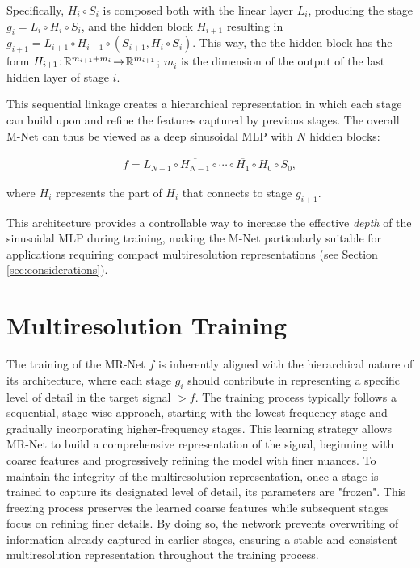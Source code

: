 Specifically, $H_i\circ  S_i$ is composed both with the linear layer $L_i$, producing the stage $g_i\! =\! L_i\!\circ\! H_i\!\circ\!  S_i$, and the hidden block $H_{i+1}$ resulting in $g_{i+1}\! =\! L_{i+1}\!\circ H_{i+1}\!\circ\left(S_{i+1}, H_i\circ  S_i\right)$. This way, the the hidden block has the form $H_{i+1}\!:\!\mathbb{R}^{m_{i+1} + m_i}\!\to\! \mathbb{R}^{m_{i+1}}$; $m_i$ is the dimension of the output of the last hidden layer of stage $i$. 

This sequential linkage creates a hierarchical representation in which each stage can build upon and refine the features captured by previous stages. The overall M-Net can thus be viewed as a deep sinusoidal MLP with \( N \) hidden blocks:

\begin{align}
    f = L_{N-1} \circ \overline{H_{N-1}} \circ \cdots \circ \overline{H_1} \circ H_0 \circ S_0,
\end{align}

where \( \overline{H_i} \) represents the part of \( H_i \) that connects to stage \( g_{i+1} \).

This architecture provides a controllable way to increase the effective \textit{depth} of the sinusoidal MLP during training, making the M-Net particularly suitable for applications requiring compact multiresolution representations (see Section \ref{sec:considerations}).


\section{Multiresolution Training}\label{sec:mr_training}
\label{s:training}

The training of the MR-Net $f$ is inherently aligned with the hierarchical nature of its architecture, where each stage $g_i$ should contribute in representing a specific level of detail in the target signal $\gt{f}$. The training process typically follows a sequential, stage-wise approach, starting with the lowest-frequency stage and gradually incorporating higher-frequency stages. This learning strategy allows MR-Net to build a comprehensive representation of the signal, beginning with coarse features and progressively refining the model with finer nuances. To maintain the integrity of the multiresolution representation, once a stage is trained to capture its designated level of detail, its parameters are "frozen". This freezing process preserves the learned coarse features while subsequent stages focus on refining finer details. By doing so, the network prevents overwriting of information already captured in earlier stages, ensuring a stable and consistent multiresolution representation throughout the training process.

